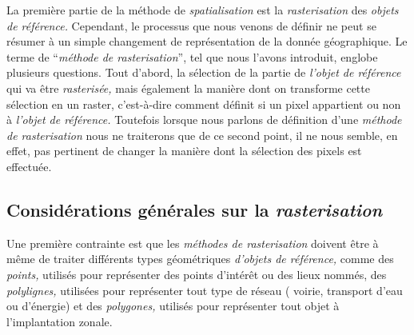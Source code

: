 La première partie de la méthode de \emph{spatialisation} est la
\emph{rasterisation} des \emph{objets de référence.} Cependant, le
processus que nous venons de définir ne peut se résumer à un simple
changement de représentation de la donnée géographique. Le terme de
\enquote{\emph{méthode de rasterisation}}, tel que nous l'avons
introduit, englobe plusieurs questions. Tout d'abord, la sélection de
la partie de \emph{l'objet de référence} qui va être
\emph{rasterisée,} mais également la manière dont on transforme cette
sélection en un raster, c'est-à-dire comment définit si un pixel
appartient ou non à \emph{l'objet de référence.} Toutefois lorsque
nous parlons de définition d'une \emph{méthode de rasterisation} nous
ne traiterons que de ce second point, il ne nous semble, en effet, pas
pertinent de changer la manière dont la sélection des pixels est
effectuée.

\subsection{Considérations générales sur la \emph{rasterisation}}

Une première contrainte est que les \emph{méthodes de rasterisation}
doivent être à même de traiter différents types géométriques
\emph{d'objets de référence,} comme des \emph{points,} utilisés pour
représenter des points d’intérêt ou des lieux nommés, des
\emph{polylignes,} utilisées pour représenter tout type de réseau (\eg
voirie, transport d'eau ou d'énergie) et des \emph{polygones,}
utilisés pour représenter tout objet à l’implantation zonale.

